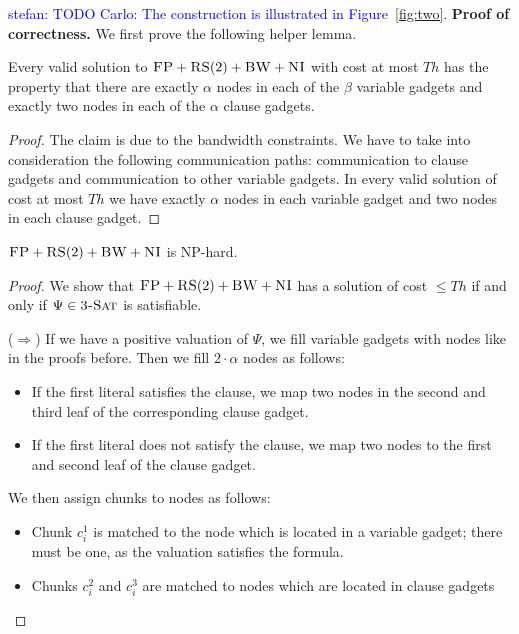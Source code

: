 \documentclass[9pt]{sigcomm-alternate}
\newcommand{\stefan}[1]{\textcolor{blue}{stefan: #1}}
\newcommand{\clauses}{\alpha}
\newcommand{\vars}{\beta}
\newcommand{\achunk}{\ensuremath{c}}
\newcommand{\CC}{\textsc{NI}}
\newcommand{\FP}{\textsc{FP}}
\newcommand{\RS}{\textsc{RS}}
\newcommand{\BW}{\textsc{BW}}
\newcommand{\TSAT}{\textsc{3-Sat}}
\newcommand{\Formula}{\ensuremath{\Psi}}
\newcommand{\Thr}{\ensuremath{Th}}
\begin{document}
\begin{appendix}
\begin{enumerate}
 \end{enumerate}

\stefan{TODO Carlo: The construction is illustrated in Figure~\ref{fig:two}.}
\textbf{Proof of correctness.}
We first prove the following helper lemma.
\begin{lemma}
Every valid solution to $\FP+\RS(2)+\BW+\CC$
with cost at most $\Thr$ has the property that
there are exactly $\clauses$ nodes in each of the $\vars$ variable gadgets
and exactly two nodes in each of the $\clauses$ clause gadgets.
\end{lemma}
\begin{proof}
The claim is due to the bandwidth constraints. We have to take into
consideration the following communication paths:
communication to clause gadgets and
communication to
other variable gadgets.
In every valid solution of cost at most $\Thr$ we have exactly
$\clauses$ nodes in each variable gadget and two nodes in each clause gadget.
\end{proof}

\begin{theorem}
$\FP+\RS(2)+\BW+\CC$ is NP-hard.
\end{theorem}
\begin{proof}
We show that $\FP+\RS(2)+\BW+\CC$ has a solution of cost $\leq
  \Thr$ if and only if $\Formula\in \TSAT$ is satisfiable.

($\Rightarrow$) If we have a positive valuation of $\Formula$, we fill variable gadgets with nodes like in
the proofs before. Then we fill $2 \cdot \clauses$ nodes as follows:
\begin{itemize}
\item If the first literal satisfies the clause, we map two nodes in the second and
third leaf of the corresponding clause gadget.
\item If the first literal does not satisfy the clause, we map two nodes to the first
and second leaf of the clause gadget.
\end{itemize}

We then assign chunks to nodes as follows:
\begin{itemize}
\item Chunk $\achunk_i^1$ is matched to the node which is located in a variable gadget; there
must be one, as the valuation satisfies the formula.
\item Chunks $\achunk_i^2$ and $\achunk_i^3$ are matched to nodes which are
located in clause
gadgets
\end{itemize}


\end{proof}
\end{appendix}
\end{document}
